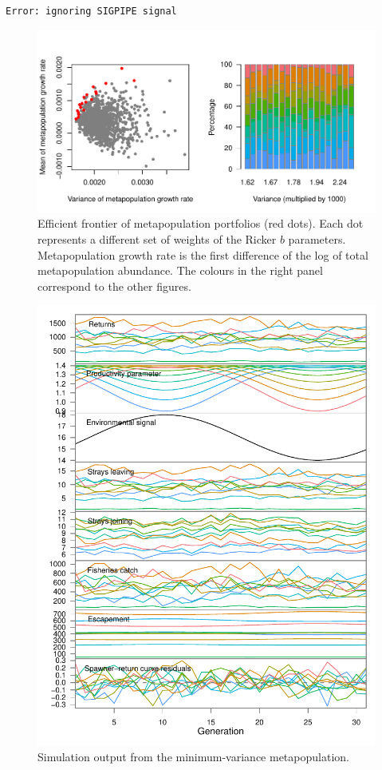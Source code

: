 \documentclass[12pt]{article}
\begin{document}
\begin{verbatim}
Error: ignoring SIGPIPE signal
\end{verbatim}

\begin{figure}[htbp]
\centering
\includegraphics{figure/eff-frontier-eg.pdf}
\caption{Efficient frontier of metapopulation portfolios (red dots).
Each dot represents a different set of weights of the Ricker $b$
parameters. Metapopulation growth rate is the first difference of the
log of total metapopulation abundance. The colours in the right panel
correspond to the other figures.}
\end{figure}

\begin{figure}[htbp]
\centering
\includegraphics{figure/plot-eff-ports.pdf}
\caption{Simulation output from the minimum-variance metapopulation.}
\end{figure}
\end{document}
